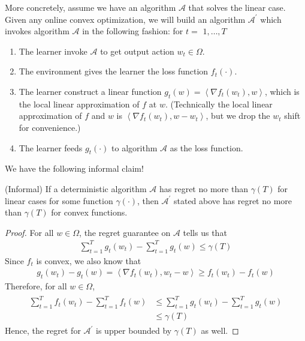 \documentclass{article}
\begin{document}
More concretely, assume we have an algorithm $\mathcal{A}$ that solves the linear case. Given any online convex optimization, we will build an algorithm $\mathcal{A}^{\prime}$ which invokes algorithm $\mathcal{A}$ in the following fashion: for $t=$ $1, \ldots, T$
\begin{enumerate}
    \item The learner invoke $\mathcal{A}$ to get output action $w_{t} \in \Omega$.
    \item The environment gives the learner the loss function $f_{t}(\cdot)$.
    \item The learner construct a linear function $g_{t}(w)=\left\langle\nabla f_{t}\left(w_{t}\right), w\right\rangle$, which is the local linear approximation of $f$ at $w$. (Technically the local linear approximation of $f$ and $w$ is $\left\langle\nabla f_{t}\left(w_{t}\right), w-w_{t}\right\rangle$, but we drop the $w_{t}$ shift for convenience.)
    \item The learner feeds $g_{t}(\cdot)$ to algorithm $\mathcal{A}$ as the loss function.
\end{enumerate}
We have the following informal claim!
\begin{lema}(Informal)
  If a deterministic algorithm $\mathcal{A}$ has regret no more than $\gamma(T)$ for linear cases for some function $\gamma(\cdot)$, then $\mathcal{A}^{\prime}$ stated above has regret no more than $\gamma(T)$ for convex functions.
\end{lema} 
\begin{proof}\color{ForestGreen}
  For all $w \in \Omega$, the regret guarantee on $\mathcal{A}$ tells us that
\begin{align*}
\sum_{t=1}^{T} g_{t}\left(w_{t}\right)-\sum_{t=1}^{T} g_{t}(w) \leq \gamma(T)
\end{align*}
Since $f_{t}$ is convex, we also know that
\begin{align*}
g_{t}\left(w_{t}\right)-g_{t}(w)=\left\langle\nabla f_{t}\left(w_{t}\right), w_{t}-w\right\rangle \geq f_{t}\left(w_{t}\right)-f_{t}(w)
\end{align*}
Therefore, for all $w \in \Omega$,
\begin{align*}
\begin{aligned}
\sum_{t=1}^{T} f_{t}\left(w_{t}\right)-\sum_{t=1}^{T} f_{t}(w) & \leq \sum_{t=1}^{T} g_{t}\left(w_{t}\right)-\sum_{t=1}^{T} g_{t}(w) \\
& \leq \gamma(T)
\end{aligned}
\end{align*}
Hence, the regret for $\mathcal{A}^{\prime}$ is upper bounded by $\gamma(T)$ as well.
\end{proof} 
\end{document}
